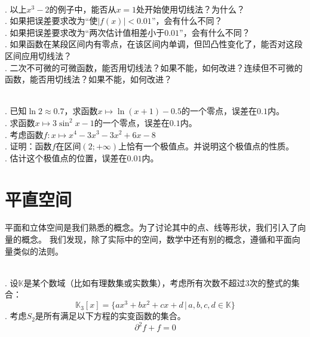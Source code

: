 \documentclass[12pt,UTF8]{ctexbook}
\begin{document}
\begin{sk}
    \mbox{} \\
    . 以上$x^3 - 2$的例子中，能否从$x=1$处开始使用切线法？为什么？\\
    . 如果把误差要求改为“使$|f(x)| < 0.01$”，会有什么不同？\\
    . 如果把误差要求改为“两次估计值相差小于$0.01$”，会有什么不同？\\
    . 如果函数在某段区间内有零点，在该区间内单调，但凹凸性变化了，能否对这段区间应用切线法？\\
    . 二次不可微的可微函数，能否用切线法？如果不能，如何改进？连续但不可微的函数，能否用切线法？如果不能，如何改进？
\end{sk}

\begin{xt}
    \mbox{} \\
    . 已知$\ln{2} \approx 0.7$，求函数$x\mapsto \ln{(x+1)} - 0.5$的一个零点，误差在$0.1$内。\\
    . 求函数$x\mapsto 3\sin^2{x} - 1$的一个零点，误差在$0.1$内。\\
    . 考虑函数$f:x\mapsto x^4-3 x^3-3 x^2+6 x-8$ \\
    . 证明：函数$f$在区间$(2;+\infty)$上恰有一个极值点。并说明这个极值点的性质。\\
    . 估计这个极值点的位置，误差在$0.01$内。
\end{xt}


\chapter{平直空间}
平面和立体空间是我们熟悉的概念。为了讨论其中的点、线等形状，我们引入了向量的概念。
我们发现，除了实际中的空间，数学中还有别的概念，遵循和平面向量类似的法则。

\begin{ex}
    \mbox{} \\
    . 设$\mathbb{K}$是某个数域（比如有理数集或实数集），考虑所有次数不超过$3$次的整式的集合：
    $$\mathbb{K}_3[x] = \{ax^3 + bx^2 + cx + d \, | \, a, b, c, d \in \mathbb{K}\}$$
    . 考虑$S_2$是所有满足以下方程的实变函数的集合。
    $$ \partial^2 f + f = 0$$
\end{ex}
\end{document}

